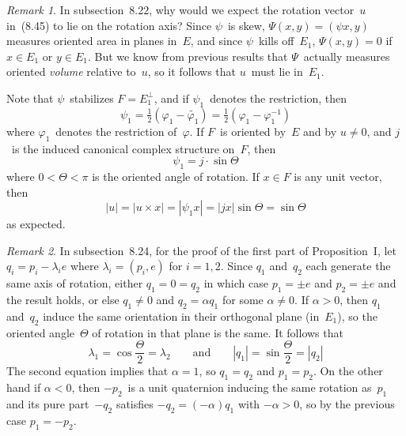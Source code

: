 \documentclass[letterpaper,12pt]{article}
\newcommand{\mult}{\cdot}
\newcommand{\cross}{\times}
\newcommand{\oc}[1]{#1^{\perp}}
\newcommand{\iprod}[2]{(#1,#2)}
\newcommand{\norm}[1]{|#1|}
\newcommand{\adj}[1]{\widetilde{#1}}
\theoremstyle{definition}
\theoremstyle{remark}
\newtheorem*{rmk}{Remark}
\begin{document}
\begin{rmk}
In subsection~8.22, why would we expect the rotation vector~\(u\) in~(8.45) to lie on the rotation axis? Since \(\psi\)~is skew, \(\Psi(x,y)=\iprod{\psi x}{y}\) measures oriented area in planes in~\(E\), and since \(\psi\)~kills off~\(E_1\), \(\Psi(x,y)=0\) if \(x\in E_1\) or \(y\in E_1\). But we know from previous results that \(\Psi\)~actually measures oriented \emph{volume} relative to~\(u\), so it follows that \(u\)~must lie in~\(E_1\).

Note that \(\psi\)~stabilizes \(F=\oc{E_1}\), and if \(\psi_1\)~denotes the restriction, then
\[\psi_1=\tfrac{1}{2}(\varphi_1-\adj{\varphi_1})=\tfrac{1}{2}(\varphi_1-\varphi_1^{-1})\]
where \(\varphi_1\)~denotes the restriction of~\(\varphi\). If \(F\)~is oriented by~\(E\) and by \(u\ne 0\), and \(j\)~is the induced canonical complex structure on~\(F\), then
\[\psi_1=j\mult\sin\Theta\]
where \(0<\Theta<\pi\) is the oriented angle of rotation. If \(x\in F\) is any unit vector, then
\[\norm{u}=\norm{u\cross x}=\norm{\psi_1 x}=\norm{jx}\sin\Theta=\sin\Theta\]
as expected.
\end{rmk}

\begin{rmk}
In subsection~8.24, for the proof of the first part of Proposition~I, let \(q_i=p_i-\lambda_i e\) where \(\lambda_i=\iprod{p_i}{e}\) for \(i=1,2\). Since \(q_1\) and~\(q_2\) each generate the same axis of rotation, either \(q_1=0=q_2\) in which case \(p_1=\pm e\) and \(p_2=\pm e\) and the result holds, or else \(q_1\ne 0\) and \(q_2=\alpha q_1\) for some \(\alpha\ne 0\). If \(\alpha>0\), then \(q_1\) and~\(q_2\) induce the same orientation in their orthogonal plane (in~\(E_1\)), so the oriented angle~\(\Theta\) of rotation in that plane is the same. It follows that
\[\lambda_1=\cos\frac{\Theta}{2}=\lambda_2\qquad\text{and}\qquad\norm{q_1}=\sin\frac{\Theta}{2}=\norm{q_2}\]
The second equation implies that \(\alpha=1\), so \(q_1=q_2\) and \(p_1=p_2\). On the other hand if \(\alpha<0\), then \(-p_2\)~is a unit quaternion inducing the same rotation as~\(p_1\) and its pure part~\(-q_2\) satisfies \(-q_2=(-\alpha)q_1\) with \(-\alpha>0\), so by the previous case \(p_1=-p_2\).
\end{rmk}
\end{document}
